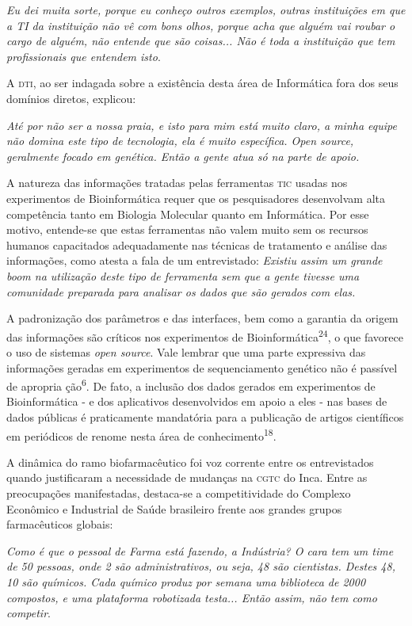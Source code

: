 \documentclass{article}
\begin{document}
\textit{Eu dei muita sorte, porque eu conheço outros exemplos, outras
instituições em que a TI da instituição não vê com bons olhos, porque acha que
alguém vai roubar o cargo de alguém, não entende que são coisas... Não é toda a
instituição que tem profissionais que entendem isto}.

A \textsc{dti}, ao ser indagada sobre a existência desta área de Informática fora dos
seus domínios diretos, explicou:

\textit{Até por não ser a nossa praia, e isto para mim está muito claro, a minha
equipe não domina este tipo de tecnologia, ela é muito específica. Open source,
geralmente focado em genética. Então a gente atua só na parte de apoio.}

A natureza das informações tratadas pelas ferramentas \textsc{tic} usadas nos
experimentos de Bioinformática requer que os pesquisadores desenvolvam alta
competência tanto em Biologia Molecular quanto em Informática. Por esse motivo,
entende-se que estas ferramentas não valem muito sem os recursos humanos
capacitados adequadamente nas técnicas de tratamento e análise das informações,
como atesta a fala de um entrevistado: \textit{Existiu assim um grande boom na
utilização deste tipo de ferramenta sem que a gente tivesse uma comunidade
preparada para analisar os dados que são gerados com elas.}

A padronização dos parâmetros e das interfaces, bem como a garantia da origem
das informações são críticos nos experimentos de
Bioinformática\textsuperscript{24}, o que favorece o uso de sistemas \textit{open source}. Vale lembrar que uma parte expressiva das informações geradas em experimentos
de sequenciamento genético não é passível de apropria ção\textsuperscript{6}. De fato, a inclusão dos dados gerados em experimentos de Bioinformática - e
dos aplicativos desenvolvidos em apoio a eles - nas bases de dados públicas é
praticamente mandatória para a publicação de artigos científicos em periódicos
de renome nesta área de conhecimento\textsuperscript{18}.

A dinâmica do ramo biofarmacêutico foi voz corrente entre os entrevistados
quando justificaram a necessidade de mudanças na \textsc{cgtc} do Inca. Entre as
preocupações manifestadas, destaca-se a competitividade do Complexo Econômico e
Industrial de Saúde brasileiro frente aos grandes grupos farmacêuticos globais:

\textit{Como é que o pessoal de Farma está fazendo, a Indústria? O cara tem um
time de 50 pessoas, onde 2 são administrativos, ou seja, 48 são cientistas.
Destes 48, 10 são químicos. Cada químico produz por semana uma biblioteca de
2000 compostos, e uma plataforma robotizada testa... Então assim, não tem como
competir}.
\end{document}
